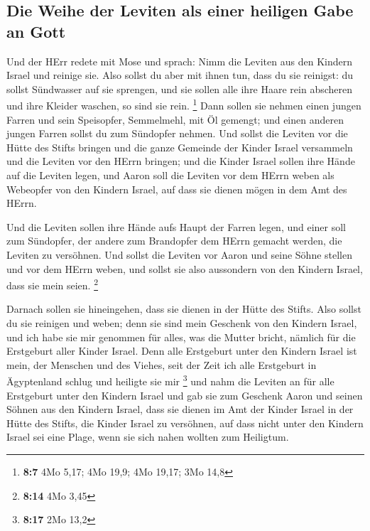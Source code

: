 \hypertarget{die-weihe-der-leviten-als-einer-heiligen-gabe-an-gott}{%
\subsection{Die Weihe der Leviten als einer heiligen Gabe an
Gott}\label{die-weihe-der-leviten-als-einer-heiligen-gabe-an-gott}}

 Und der HErr redete mit Mose und sprach: 
Nimm die Leviten aus den Kindern Israel und reinige sie. 
Also sollst du aber mit ihnen tun, dass du sie reinigst: du sollst
Sündwasser auf sie sprengen, und sie sollen alle ihre Haare rein
abscheren und ihre Kleider waschen, so sind sie rein. \footnote{\textbf{8:7}
  4Mo 5,17; 4Mo 19,9; 4Mo 19,17; 3Mo 14,8}  Dann sollen
sie nehmen einen jungen Farren und sein Speisopfer, Semmelmehl, mit Öl
gemengt; und einen anderen jungen Farren sollst du zum Sündopfer nehmen.
 Und sollst die Leviten vor die Hütte des Stifts bringen
und die ganze Gemeinde der Kinder Israel versammeln  und
die Leviten vor den HErrn bringen; und die Kinder Israel sollen ihre
Hände auf die Leviten legen,  und Aaron soll die Leviten
vor dem HErrn weben als Webeopfer von den Kindern Israel, auf dass sie
dienen mögen in dem Amt des HErrn.

 Und die Leviten sollen ihre Hände aufs Haupt der Farren
legen, und einer soll zum Sündopfer, der andere zum Brandopfer dem HErrn
gemacht werden, die Leviten zu versöhnen.  Und sollst die
Leviten vor Aaron und seine Söhne stellen und vor dem HErrn weben,
 und sollst sie also aussondern von den Kindern Israel,
dass sie mein seien. \footnote{\textbf{8:14} 4Mo 3,45}

 Darnach sollen sie hineingehen, dass sie dienen in der
Hütte des Stifts. Also sollst du sie reinigen und weben; 
denn sie sind mein Geschenk von den Kindern Israel, und ich habe sie mir
genommen für alles, was die Mutter bricht, nämlich für die Erstgeburt
aller Kinder Israel.  Denn alle Erstgeburt unter den
Kindern Israel ist mein, der Menschen und des Viehes, seit der Zeit ich
alle Erstgeburt in Ägyptenland schlug und heiligte sie mir \footnote{\textbf{8:17}
  2Mo 13,2}  und nahm die Leviten an für alle Erstgeburt
unter den Kindern Israel  und gab sie zum Geschenk Aaron
und seinen Söhnen aus den Kindern Israel, dass sie dienen im Amt der
Kinder Israel in der Hütte des Stifts, die Kinder Israel zu versöhnen,
auf dass nicht unter den Kindern Israel sei eine Plage, wenn sie sich
nahen wollten zum Heiligtum.

